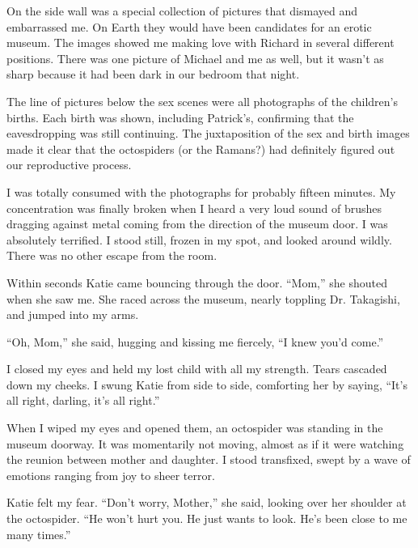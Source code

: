 \documentclass[]{article}
\begin{document}
On the side wall was a special collection of pictures that dismayed and embarrassed me.  On Earth they would have been candidates for an erotic museum.  The images showed me making love with Richard in several different positions.  There was one picture of Michael and me as well, but it wasn’t as sharp because it had been dark in our bedroom that night.

The line of pictures below the sex scenes were all photographs of the children’s births.  Each birth was shown, including Patrick’s, confirming that the eavesdropping was still continuing.  The juxtaposition of the sex and birth images made it clear that the octospiders (or the Ramans?) had definitely figured out our reproductive process.

I was totally consumed with the photographs for probably fifteen minutes.  My concentration was finally broken when I heard a very loud sound of brushes dragging against metal coming from the direction of the museum door.  I was absolutely terrified.  I stood still, frozen in my spot, and looked around wildly.  There was no other escape from the room.

Within seconds Katie came bouncing through the door.  “Mom,” she shouted when she saw me.  She raced across the museum, nearly toppling Dr.  Takagishi, and jumped into my arms.

“Oh, Mom,” she said, hugging and kissing me fiercely, “I knew you’d come.”

I closed my eyes and held my lost child with all my strength.  Tears cascaded down my cheeks.  I swung Katie from side to side, comforting her by saying, “It’s all right, darling, it’s all right.”

When I wiped my eyes and opened them, an octospider was standing in the museum doorway.  It was momentarily not moving, almost as if it were watching the reunion between mother and daughter.  I stood transfixed, swept by a wave of emotions ranging from joy to sheer terror.

Katie felt my fear.  “Don’t worry, Mother,” she said, looking over her shoulder at the octospider.  “He won’t hurt you.  He just wants to look.  He’s been close to me many times.”
\end{document}
